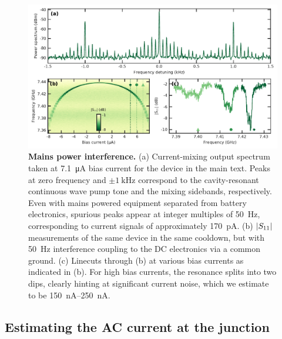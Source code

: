 \begin{figure}
	\centering
	\includegraphics[width=\linewidth]{chapter-currentdetection/figures/SM_50Hz_interference}
	\caption{
		\textbf{Mains power interference.}
		(a) Current-mixing output spectrum taken at \SI{7.1}{\micro\ampere} bias current for the device in the main text.
		Peaks at zero frequency and $\pm\SI{1}{\kilo\hertz}$ correspond to the cavity-resonant continuous wave pump tone and the mixing sidebands, respectively.
		Even with mains powered equipment separated from battery electronics, spurious peaks appear at integer multiples of \SI{50}{\hertz}, corresponding to current signals of approximately \SI{170}{\pico\ampere}.
		(b) $\lvert S_{11}\rvert$ measurements of the same device in the same cooldown, but with \SI{50}{\hertz} interference coupling to the DC electronics via a common ground.
		(c) Linecuts through (b) at various bias currents as indicated in (b).
		For high bias currents, the resonance splits into two dips, clearly hinting at significant current noise, which we estimate to be \SIrange{150}{250}{\nano\ampere}.
	}
	\label{fig:50hzinterference}
\end{figure}

\subsection{Estimating the AC current at the junction}\label{sec:accurrent}

